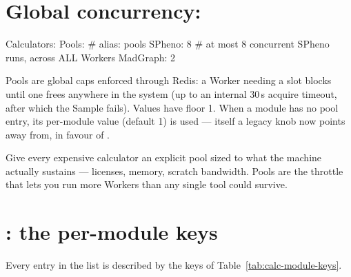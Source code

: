 \section{Global concurrency: }
\label{sec:pools}

\begin{yamlwin}
Calculators:
  Pools:            # alias: pools
    SPheno: 8       # at most 8 concurrent SPheno runs, across ALL Workers
    MadGraph: 2
\end{yamlwin}

Pools are global caps enforced through Redis: a Worker needing a slot blocks until one
frees anywhere in the system (up to an internal 30\,s acquire timeout, after which the
Sample fails). Values have floor 1. When a module has no pool entry, its per-module
 value (default 1) is used --- itself a legacy knob  now points away from, in favour of .

\begin{jtip}
Give every expensive calculator an explicit pool sized to what the machine actually
sustains --- licenses, memory, scratch bandwidth. Pools are the throttle that lets you
run more Workers than any single tool could survive.
\end{jtip}

\section{: the per-module keys}
\label{sec:calc-module-keys}

Every entry in the list is described by the keys of Table~\ref{tab:calc-module-keys}.

